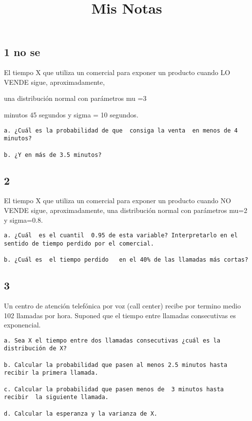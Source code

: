 \documentclass[
  10pt,
]{article}
\title{Mis Notas}
\author{}
\date{\vspace{-2.5em}}
\begin{document}
\maketitle

\hypertarget{no-se}{%
\subsection{1 no se}\label{no-se}}

El tiempo X que utiliza un comercial para exponer un producto cuando LO
VENDE sigue, aproximadamente,

una distribución normal con parámetros mu =3

minutos 45 segundos y sigma = 10 segundos.

\begin{verbatim}
a. ¿Cuál es la probabilidad de que  consiga la venta  en menos de 4 minutos? 

b. ¿Y en más de 3.5 minutos?
\end{verbatim}

\hypertarget{section}{%
\subsection{2}\label{section}}

El tiempo X que utiliza un comercial para exponer un producto cuando NO
VENDE sigue, aproximadamente, una distribución normal con parámetros
mu=2 y sigma=0.8.

\begin{verbatim}
a. ¿Cuál  es el cuantil  0.95 de esta variable? Interpretarlo en el sentido de tiempo perdido por el comercial.

b. ¿Cuál es  el tiempo perdido   en el 40% de las llamadas más cortas?
\end{verbatim}

\hypertarget{section-1}{%
\subsection{3}\label{section-1}}

Un centro de atención telefónica por voz (call center) recibe por
termino medio 102 llamadas por hora. Suponed que el tiempo entre
llamadas consecutivas es exponencial.

\begin{verbatim}
a. Sea X el tiempo entre dos llamadas consecutivas ¿cuál es la distribución de X?

b. Calcular la probabilidad que pasen al menos 2.5 minutos hasta recibir la primera llamada.

c. Calcular la probabilidad que pasen menos de  3 minutos hasta recibir  la siguiente llamada.

d. Calcular la esperanza y la varianza de X.
\end{verbatim}
\end{document}
